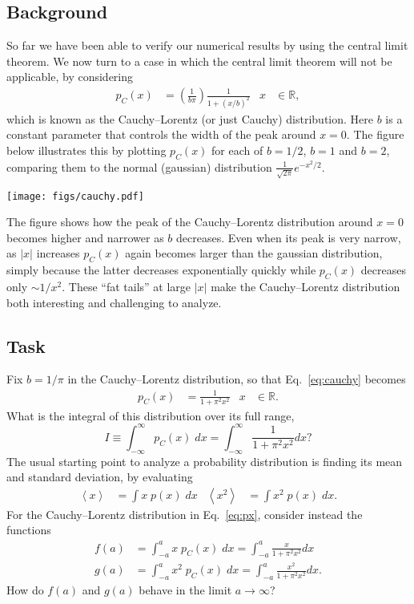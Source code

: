 \documentclass[12 pt]{article} %
\newcommand{\Rbb}{\ensuremath{\mathbb R} }
\newcommand{\vev}[1]{\ensuremath{\left\langle #1 \right\rangle} }
\newcommand{\eq}[1]{Eq.~\ref{#1}}
\begin{document}
\subsection*{Background}
So far we have been able to verify our numerical results by using the central limit theorem.
We now turn to a case in which the central limit theorem will not be applicable, by considering
\begin{align}
  \label{eq:cauchy}
  p_C(x) & = \left(\frac{1}{b \pi}\right) \frac{1}{1 + (x / b)^2} &
  x & \in \Rbb,
\end{align}
which is known as the Cauchy--Lorentz (or just Cauchy) distribution.
Here $b$ is a constant parameter that controls the width of the peak around $x = 0$.
The figure below illustrates this by plotting $p_C(x)$ for each of $b = 1 / 2$, $b = 1$ and $b = 2$, comparing them to the normal (gaussian) distribution $\displaystyle \frac{1}{\sqrt{2\pi}} e^{-x^2 / 2}$.

\begin{center}\texttt{[image: figs/cauchy.pdf]}\end{center}

The figure shows how the peak of the Cauchy--Lorentz distribution around $x = 0$ becomes higher and narrower as $b$ decreases.
Even when its peak is very narrow, as $|x|$ increases $p_C(x)$ again becomes larger than the gaussian distribution, simply because the latter decreases exponentially quickly while $p_C(x)$ decreases only $\sim 1 / x^2$.
These ``fat tails'' at large $|x|$ make the Cauchy--Lorentz distribution both interesting and challenging to analyze.

\subsection*{Task}
Fix $b = 1 / \pi$ in the Cauchy--Lorentz distribution, so that \eq{eq:cauchy} becomes
\begin{align}
  \label{eq:px}
  p_C(x) & = \frac{1}{1 + \pi^2 x^2} &
  x & \in \Rbb.
\end{align}
What is the integral of this distribution over its full range,
\begin{equation*}
  I \equiv \int_{-\infty}^{\infty} p_C(x) \; dx = \int_{-\infty}^{\infty} \frac{1}{1 + \pi^2 x^2} dx?
\end{equation*}
The usual starting point to analyze a probability distribution is finding its mean and standard deviation, by evaluating
\begin{align*}
  \vev{x} & = \int x \; p(x) \; dx &
  \vev{x^2} & = \int x^2 \; p(x) \; dx.
\end{align*}
For the Cauchy--Lorentz distribution in \eq{eq:px}, consider instead the functions
\begin{align*}
  f(a) & = \int_{-a}^a x \; p_C(x) \; dx = \int_{-a}^a \frac{x}{1 + \pi^2 x^2} dx \\
  g(a) & = \int_{-a}^a x^2 \; p_C(x) \; dx = \int_{-a}^a \frac{x^2}{1 + \pi^2 x^2} dx.
\end{align*}
How do $f(a)$ and $g(a)$ behave in the limit $a \to \infty$?
\end{document}
